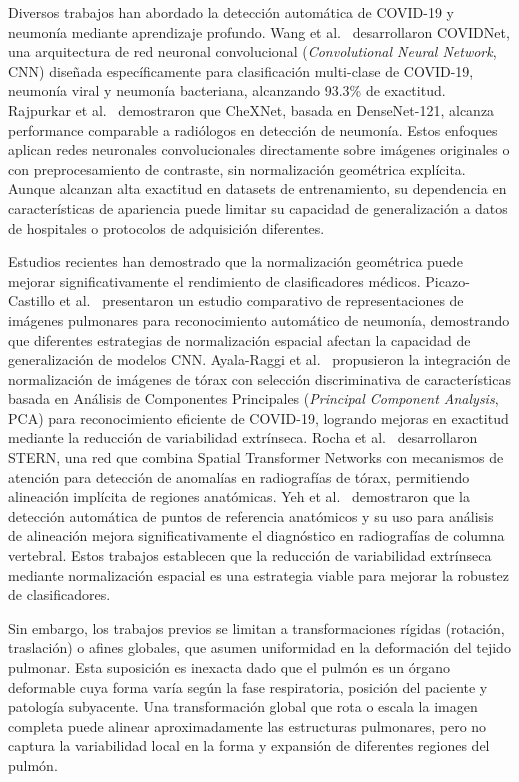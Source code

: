 Diversos trabajos han abordado la detecci\'on autom\'atica de COVID-19 y neumon\'ia mediante aprendizaje profundo. Wang et al.\ \cite{wang2020covidnet} desarrollaron COVIDNet, una arquitectura de red neuronal convolucional (\textit{Convolutional Neural Network}, CNN) dise\~nada espec\'ificamente para clasificaci\'on multi-clase de COVID-19, neumon\'ia viral y neumon\'ia bacteriana, alcanzando 93.3\% de exactitud. Rajpurkar et al.\ \cite{rajpurkar2017chexnet} demostraron que CheXNet, basada en DenseNet-121, alcanza performance comparable a radi\'ologos en detecci\'on de neumon\'ia. Estos enfoques aplican redes neuronales convolucionales directamente sobre im\'agenes originales o con preprocesamiento de contraste, sin normalizaci\'on geom\'etrica expl\'icita. Aunque alcanzan alta exactitud en datasets de entrenamiento, su dependencia en caracter\'isticas de apariencia puede limitar su capacidad de generalizaci\'on a datos de hospitales o protocolos de adquisici\'on diferentes.

Estudios recientes han demostrado que la normalizaci\'on geom\'etrica puede mejorar significativamente el rendimiento de clasificadores m\'edicos. Picazo-Castillo et al.\ \cite{picazo2024comparative} presentaron un estudio comparativo de representaciones de im\'agenes pulmonares para reconocimiento autom\'atico de neumon\'ia, demostrando que diferentes estrategias de normalizaci\'on espacial afectan la capacidad de generalizaci\'on de modelos CNN. Ayala-Raggi et al.\ \cite{ayala2023synergizing} propusieron la integraci\'on de normalizaci\'on de im\'agenes de t\'orax con selecci\'on discriminativa de caracter\'isticas basada en An\'alisis de Componentes Principales (\textit{Principal Component Analysis}, PCA) para reconocimiento eficiente de COVID-19, logrando mejoras en exactitud mediante la reducci\'on de variabilidad extr\'inseca. Rocha et al.\ \cite{rocha2024stern} desarrollaron STERN, una red que combina Spatial Transformer Networks con mecanismos de atenci\'on para detecci\'on de anomal\'ias en radiograf\'ias de t\'orax, permitiendo alineaci\'on impl\'icita de regiones anat\'omicas. Yeh et al.\ \cite{yeh2021deep} demostraron que la detecci\'on autom\'atica de puntos de referencia anat\'omicos y su uso para an\'alisis de alineaci\'on mejora significativamente el diagn\'ostico en radiograf\'ias de columna vertebral. Estos trabajos establecen que la reducci\'on de variabilidad extr\'inseca mediante normalizaci\'on espacial es una estrategia viable para mejorar la robustez de clasificadores.

Sin embargo, los trabajos previos se limitan a transformaciones r\'igidas (rotaci\'on, traslaci\'on) o afines globales, que asumen uniformidad en la deformaci\'on del tejido pulmonar. Esta suposici\'on es inexacta dado que el pulm\'on es un \'organo deformable cuya forma var\'ia seg\'un la fase respiratoria, posici\'on del paciente y patolog\'ia subyacente. Una transformaci\'on global que rota o escala la imagen completa puede alinear aproximadamente las estructuras pulmonares, pero no captura la variabilidad local en la forma y expansi\'on de diferentes regiones del pulm\'on.


